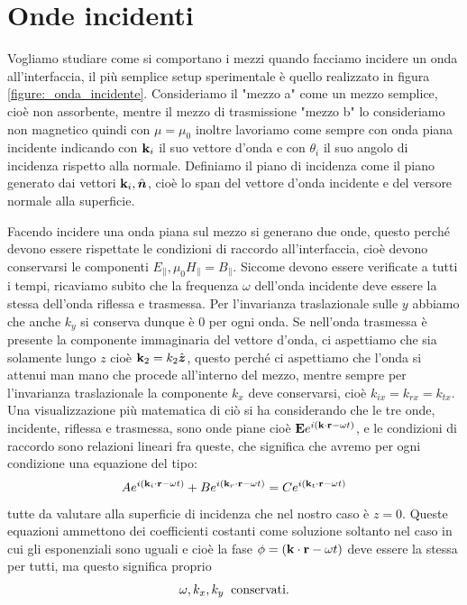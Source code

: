\section{Onde incidenti} \label{sec: onde incidenti}
Vogliamo studiare come si comportano i mezzi quando facciamo incidere un onda all'interfaccia, il più semplice setup sperimentale è quello realizzato in 
figura \ref{figure:_onda_incidente}.  
Consideriamo il "mezzo a" come un mezzo semplice, cioè non assorbente, mentre il mezzo di trasmissione "mezzo b" lo consideriamo non magnetico quindi con 
$\mu=\mu_0 $ inoltre lavoriamo come sempre con onda piana incidente indicando con $ \mathbf{k}_i $ il suo vettore d'onda e con $ \theta_i $ il suo angolo 
di incidenza rispetto alla normale. Definiamo il piano di incidenza come il piano generato dai vettori $ \mathbf{k}_i, \hat{\boldsymbol{n}} $, cioè lo span del vettore 
d'onda incidente e del versore normale alla superficie.

Facendo incidere una onda piana sul mezzo si generano due onde, questo perché devono essere rispettate le condizioni di raccordo all'interfaccia, cioè 
devono conservarsi le componenti $ E_\parallel, \mu_0 H_\parallel = B_\parallel $. Siccome devono essere verificate a tutti i tempi, ricaviamo subito che 
la frequenza $ \omega $ dell'onda incidente deve essere la stessa dell'onda riflessa e trasmessa. Per l'invarianza traslazionale sulle $ y $ abbiamo che 
anche $ k_{y} $ si conserva dunque è $ 0 $ per ogni onda. Se nell'onda trasmessa è presente la componente immaginaria del vettore d'onda, ci aspettiamo 
che sia solamente lungo $ z $ cioè $ \mathbf{k}_2 = k_2 \hat{\boldsymbol{z}} $, questo perché ci aspettiamo che l'onda si attenui man mano che procede all'interno del mezzo, 
mentre sempre per l'invarianza traslazionale la componente $ k_x $ deve conservarsi, cioè $ k_{ix} = k_{rx} = k_{tx} $. Una visualizzazione più matematica 
di ciò si ha considerando che le tre onde, incidente, riflessa e trasmessa, sono onde piane cioè $ \mathbf{E} e^{i(\mathbf{k\cdot r } - \omega t)} $, e le condizioni 
di raccordo sono relazioni lineari fra queste, che significa che avremo per ogni condizione una equazione del tipo:
\begin{align}
  A e^{i(\mathbf{k}_i \cdot \mathbf{r} - \omega t)} + B e^{i(\mathbf{k}_r \cdot \mathbf{r} - \omega t)} = C e^{i(\mathbf{k}_t \cdot \mathbf{r} - \omega t)}
\end{align} 
tutte da valutare alla superficie di incidenza che nel nostro caso è $ z = 0 $. Queste equazioni ammettono dei coefficienti costanti come soluzione 
soltanto nel caso in cui gli esponenziali sono uguali e cioè la fase $ \phi = (\mathbf{k\cdot r } - \omega t) $ deve essere la stessa per tutti, 
ma questo significa proprio
\begin{align}
  \omega, k_x, k_y \;\; \textnormal{conservati.}
\end{align}


